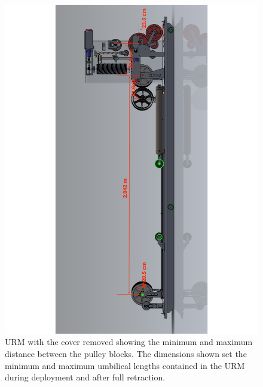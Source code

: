 \documentclass[11pt]{article}
\begin{document}
\begin{figure}
  \begin{center}
    \includegraphics[height=\textwidth,angle=270]{URMSideview}
  \end{center}
  \caption{URM with the cover removed showing the minimum and maximum distance between the pulley blocks. The dimensions shown set the minimum and maximum umbilical lengths contained in the URM during deployment and after full retraction.}
  \label{fig:URMSideview}
\end{figure}
\end{document}
